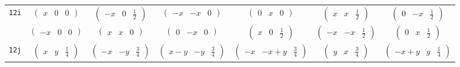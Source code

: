 \documentclass[fleqn,9pt,landscape]{jsarticle}
\begin{document}
\begin{center}
\begin{longtable}{ccccccc}
{\tt 12i} & $ \begin{pmatrix} x & 0 & 0 \end{pmatrix} $ & $ \begin{pmatrix} - x & 0 & \frac{1}{2} \end{pmatrix} $ & $ \begin{pmatrix} - x & - x & 0 \end{pmatrix} $ & $ \begin{pmatrix} 0 & x & 0 \end{pmatrix} $ & $ \begin{pmatrix} x & x & \frac{1}{2} \end{pmatrix} $ & $ \begin{pmatrix} 0 & - x & \frac{1}{2} \end{pmatrix} $ \\
& $ \begin{pmatrix} - x & 0 & 0 \end{pmatrix} $ & $ \begin{pmatrix} x & x & 0 \end{pmatrix} $ & $ \begin{pmatrix} 0 & - x & 0 \end{pmatrix} $ & $ \begin{pmatrix} x & 0 & \frac{1}{2} \end{pmatrix} $ & $ \begin{pmatrix} - x & - x & \frac{1}{2} \end{pmatrix} $ & $ \begin{pmatrix} 0 & x & \frac{1}{2} \end{pmatrix} $ \\ \hline
{\tt 12j} & $ \begin{pmatrix} x & y & \frac{1}{4} \end{pmatrix} $ & $ \begin{pmatrix} - x & - y & \frac{3}{4} \end{pmatrix} $ & $ \begin{pmatrix} x - y & - y & \frac{3}{4} \end{pmatrix} $ & $ \begin{pmatrix} - x & - x + y & \frac{3}{4} \end{pmatrix} $ & $ \begin{pmatrix} y & x & \frac{3}{4} \end{pmatrix} $ & $ \begin{pmatrix} - x + y & y & \frac{1}{4} \end{pmatrix} $ \\

\end{longtable}
\end{center}
\end{document}
